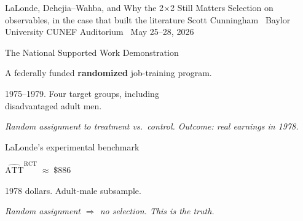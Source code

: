 \documentclass[11pt,aspectratio=169]{beamer}
\begin{document}
\codechellatitle
  {LaLonde, Dehejia--Wahba, and Why the 2$\times$2 Still Matters}
  {Selection on observables, in the case that built the literature}
  {Scott Cunningham \textperiodcentered\ Baylor University}
  {CUNEF Auditorium \textperiodcentered\ May 25--28, 2026}


\begin{frame}{The National Supported Work Demonstration}
\vspace{1em}
\begin{center}
\large
A federally funded \textbf{randomized} job-training program.
\end{center}
\vspace{0.4em}
\begin{center}
\large
1975--1979. Four target groups, including \\[0.2em] disadvantaged adult men.
\end{center}
\vspace{0.6em}
\begin{center}
\small\color{warmgray}\itshape
Random assignment to treatment vs.\ control. \;Outcome: real earnings in 1978.
\end{center}
\end{frame}

\begin{frame}{LaLonde's experimental benchmark}
\vspace{1.6em}
\begin{center}
\Large
$\widehat{\text{ATT}}^{\text{RCT}} \;\approx\; \$886$
\end{center}
\vspace{0.6em}
\begin{center}
1978 dollars. \;Adult-male subsample.
\end{center}
\vspace{1em}
\begin{center}
\small\color{warmgray}\itshape
Random assignment $\Rightarrow$ no selection. \;This is the \textit{truth}.
\end{center}
\end{frame}
\end{document}
